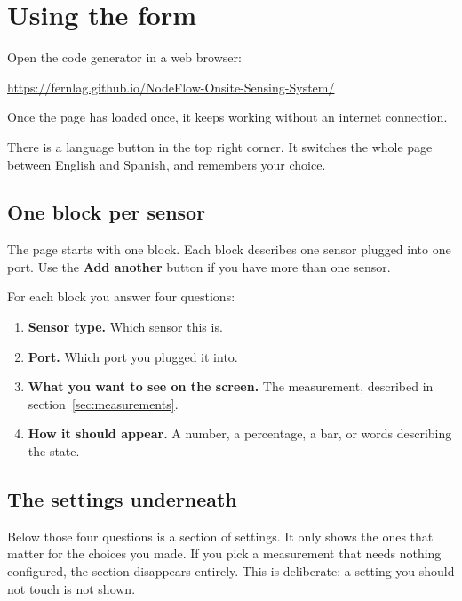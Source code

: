 \documentclass[11pt,a4paper]{article}
\newenvironment{note}
  {\par\medskip\noindent
   \begin{lrbox}{\nfbox}\begin{minipage}{0.94\linewidth}\vspace{2pt}}
  {\vspace{2pt}\end{minipage}\end{lrbox}%
   \fcolorbox{leaf}{paper}{\usebox{\nfbox}}\par\medskip}
\begin{document}
\section{Using the form}

Open the code generator in a web browser:

\begin{center}
\url{https://fernlag.github.io/NodeFlow-Onsite-Sensing-System/}
\end{center}

Once the page has loaded once, it keeps working without an internet connection.

\begin{note}
There is a language button in the top right corner. It switches the whole page
between English and Spanish, and remembers your choice.
\end{note}

\subsection{One block per sensor}

The page starts with one block. Each block describes one sensor plugged into
one port. Use the \textbf{Add another} button if you have more than one sensor.

For each block you answer four questions:

\begin{enumerate}
  \item \textbf{Sensor type.} Which sensor this is.
  \item \textbf{Port.} Which port you plugged it into.
  \item \textbf{What you want to see on the screen.} The measurement, described
        in section~\ref{sec:measurements}.
  \item \textbf{How it should appear.} A number, a percentage, a bar, or words
        describing the state.
\end{enumerate}

\subsection{The settings underneath}

Below those four questions is a section of settings. It only shows the ones
that matter for the choices you made. If you pick a measurement that needs
nothing configured, the section disappears entirely. This is deliberate: a
setting you should not touch is not shown.
\end{document}
